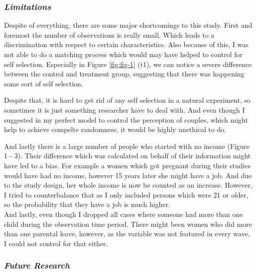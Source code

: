 \documentclass[
  12pt,
]{article}
\begin{document}
\hypertarget{limitations-1}{%
\subsubsection*{\texorpdfstring{\emph{Limitations}}{Limitations}}\label{limitations-1}}

Despite of everything, there are some major shortcomings to this study. First and foremost the number of observations is really small. Which leads to a discrimination with respect to certain characteristics. Also because of this, I was not able to do a matching process which would may have helped to control for self selection. Especially in Figure \ref{fig:fig-1} (t1), we can notice a severe difference between the control and treatment group, suggesting that there was happening some sort of self selection.

Despite that, it is hard to get rid of any self selection in a natural experiment, so sometimes it is just something researcher have to deal with.
And even though I suggested in my perfect model to control the perception of couples, which might help to achieve compelte randomness, it would be highly unethical to do.

And lastly there is a large number of people who started with no income (Figure 1 - 3). Their difference which was calculated on behalf of their information might have led to a bias. For example a women which got pregnant during their studies would have had no income, however 15 years later she might have a job.
And due to the study design, her whole income is now be counted as an increase. However, I tried to counterbalance that as I only included persons which were 21 or older, so the probability that they have a job is much higher.\\
And lastly, even though I dropped all cases where someone had more than one child during the observation time period. There might been women who did more than one parental leave, however, as the variable was not featured in every wave, I could not control for that either.

\hypertarget{future-research}{%
\subsubsection*{\texorpdfstring{\emph{Future Research}}{Future Research}}\label{future-research}}
\end{document}
